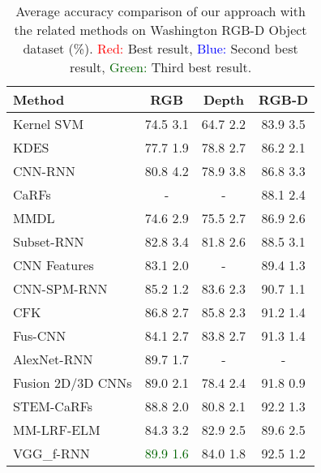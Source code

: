 \documentclass[10pt,journal,compsoc]{IEEEtran}
\newcommand{\bftab}{\fontseries{b}\selectfont}
\begin{document}
\begin{table}\caption{Average accuracy comparison of our approach with the related methods on Washington RGB-D Object dataset (\%). \textcolor{red}{Red:} Best result, \textcolor{blue}{Blue:} Second best result, \textcolor{darkgreen}{Green:} Third best result.}
	\begin{center}
		\setlength{\tabcolsep}{0.9em} \def\arraystretch{1.2}
		\begin{adjustbox}{width=\columnwidth}
		\begin{tabular}{ lccc }
			\hline
			Method 											& RGB 							& Depth 						& RGB-D \\ \hline \hline
			Kernel SVM \cite{Lai_ICRA_2011}    				& 74.5  3.1 			& 64.7  2.2 	 		& 83.9  3.5			\\ KDES \cite{Bo_IROS_2011}         				& 77.7  1.9 			& 78.8  2.7 			& 86.2  2.1			\\ CNN-RNN \cite{Socher_NIPS_2012}    				& 80.8  4.2 			& 78.9  3.8			& 86.8  3.3			\\ CaRFs \cite{Asif_ICRA_2015}         			& - 			                & - 			                & 88.1  2.4			\\ MMDL \cite{Wang_2015_IEEE_ToM}         			& 74.6  2.9			& 75.5  2.7			& 86.9  2.6			\\ Subset-RNN \cite{Bai_Neurocomp_2015}  			& 82.8  3.4 			& 81.8  2.6 	 		& 88.5  3.1			\\ CNN Features \cite{Schwarz_ICRA_2015}  	        & 83.1  2.0 			& -								& 89.4  1.3			\\ CNN-SPM-RNN \cite{Cheng_CVIU_2015}        		& 85.2  1.2		 	& 83.6  2.3 			& 90.7  1.1			\\ CFK \cite{Cheng_3DV_2015}  						& 86.8  2.7 			& 85.8  2.3	        & 91.2  1.4			\\ Fus-CNN \cite{Eitel_IROS_2015}  	        	& 84.1  2.7 			& 83.8  2.7			& 91.3  1.4			\\ AlexNet-RNN \cite{Bui_Access_2016}  			& 89.7  1.7 			& -								& -								\\ Fusion 2D/3D CNNs \cite{Zia_ICCVW_2017}         & 89.0  2.1 			& 78.4  2.4			& 91.8  0.9			\\ STEM-CaRFs \cite{Asif_ToR_2017}  			    & 88.8  2.0 			& 80.8  2.1			& 92.2  1.3			\\
			MM-LRF-ELM \cite{Liu_Neurocomp_2018}        	& 84.3  3.2		 	& 82.9  2.5 			& 89.6  2.5			\\ VGG\_f-RNN \cite{Caglayan_ECCVW_2018}     		& \bftab\textcolor{darkgreen}{89.9  1.6} 	        & 84.0  1.8			& 92.5  1.2	        \\

\end{tabular}
\end{adjustbox}
\end{center}
\end{table}
\end{document}
